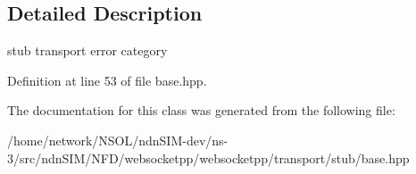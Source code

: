 \subsection{Detailed Description}
stub transport error category 

Definition at line 53 of file base.\+hpp.



The documentation for this class was generated from the following file\+:\begin{DoxyCompactItemize}
\item 
/home/network/\+N\+S\+O\+L/ndn\+S\+I\+M-\/dev/ns-\/3/src/ndn\+S\+I\+M/\+N\+F\+D/websocketpp/websocketpp/transport/stub/base.\+hpp\end{DoxyCompactItemize}
